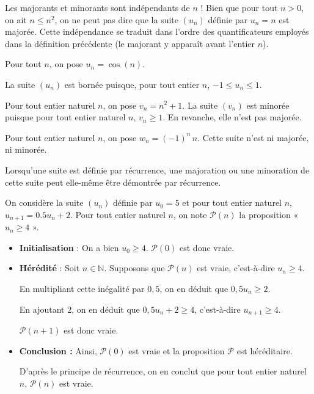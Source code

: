 \documentclass[11pt,fleqn]{book} %
\begin{document}
Les majorants et minorants sont indépendants de $n$ ! Bien que pour tout $n>0$, on ait $n \leqslant n^2$, on ne peut pas dire que la suite $(u_n)$ définie par $u_n=n$ est majorée. Cette indépendance se traduit dans l'ordre des quantificateurs employés dans la définition précédente (le majorant y apparaît avant l'entier $n$).


\begin{example} Pour tout $n$, on pose $u_n=\cos (n)$. 

La suite $(u_n)$ est bornée puisque, pour tout entier $n$, $-1 \leqslant u_n \leqslant 1$.\end{example}

\begin{example} Pour tout entier naturel $n$, on pose $v_n=n^2+1$. La suite $(v_n)$ est minorée puisque pour tout entier naturel $n$, $v_n\geqslant 1$. En revanche, elle n'est pas majorée. \end{example}

\begin{example} Pour tout entier naturel $n$, on pose $w_n=(-1)^n \, n$. Cette suite n'est ni majorée, ni minorée.\end{example}

Lorsqu'une suite est définie par récurrence, une majoration ou une minoration de cette suite peut elle-même être démontrée par récurrence.

\begin{example} On considère la suite $(u_n)$ définie par $u_0 = 5$ et pour tout entier naturel $n$, $u_{n+1}=0.5u_n + 2$. Pour tout entier naturel $n$, on note $\mathcal{P}(n)$ la proposition « $u_n \geqslant 4$ ».
\begin{itemize}
\item \textbf{Initialisation} : On a bien $u_0 \geqslant 4$. $\mathcal{P}(0)$ est donc vraie.
\vskip5pt
\item \textbf{Hérédité} : Soit $n\in\mathbb{N}$. Supposons que $\mathcal{P}(n)$ est vraie, c'est-à-dire $u_n \geqslant 4$. 

En multipliant cette inégalité par $0,5$, on en déduit que $0,5 u_n \geqslant 2$. 

En ajoutant 2, on en déduit que $0,5u_n+2 \geqslant 4$, c'est-à-dire $u_{n+1}\geqslant 4$. 

$\mathcal{P}(n+1)$ est donc vraie.
\vskip5pt
\item \textbf{Conclusion :} Ainsi, $\mathcal{P}(0)$ est vraie et la proposition $\mathcal{P}$ est héréditaire. 

D'après le principe de récurrence, on en conclut que pour tout entier naturel $n$, $\mathcal{P}(n)$ est vraie.
\end{itemize}\end{example}
\end{document}
